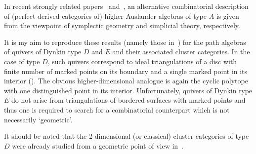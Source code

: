 \documentclass[a4paper,oneside,svgnames]{amsart}
\theoremstyle{plain}
\theoremstyle{definition}
\begin{document}
 In recent strongly related papers~\cite{djw} and~\cite{djy}, an alternative
 combinatorial description of (perfect derived categories of) higher Auslander
 algebras of type $A$ is given from the viewpoint of symplectic geometry and
 simplicial theory, respectively.

 It is my aim to reproduce these results (namely those in~\cite{ot}) for the
 path algebras of quivers of Dynkin type $D$ and $E$ and their associated
 cluster categories. In the case of type $D$, such quivers correspond to ideal
 triangulations of a disc with finite number of marked points on its boundary
 and a single marked point in its interior (\cite{fst}). The obvious
 higher-dimensional analogue is again the cyclic polytope with one distinguished
 point in its interior. Unfortunately, quivers of Dynkin type $E$ do not arise
 from triangulations of bordered surfaces with marked points and thus one is
 required to search for a combinatorial counterpart which is not necessarily
 `geometric'.

 It should be noted that the 2-dimensional (or classical) cluster categories of
 type $D$ were already studied from a geometric point of view in~\cite{schif}.
\end{document}
